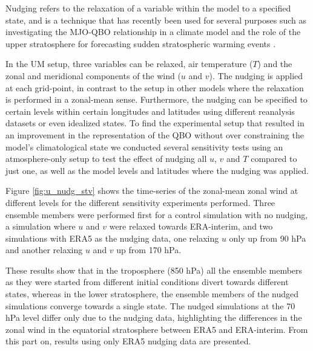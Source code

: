 Nudging refers to the relaxation of a variable within the model to a specified state, and is a technique that has recently been used for several purposes such as investigating the MJO-QBO relationship in a climate model \citep{martin2021} and the role of the upper stratosphere for forecasting sudden stratospheric warming events \citep{gray2020}.

In the UM setup, three variables can be relaxed, air temperature ($T$) and the zonal and meridional components of the wind ($u$ and $v$). The nudging is applied at each grid-point, in contrast to the setup in other models \citep[e.g.][]{martin2021} where the relaxation is performed in a zonal-mean sense. Furthermore, the nudging can be specified to certain levels within certain longitudes and latitudes using different reanalysis datasets or even idealized states. To find the experimental setup that resulted in an improvement in the representation of the QBO without over constraining the model's climatological state we conducted several sensitivity tests using an atmosphere-only setup to test the effect of nudging all $u$, $v$ and $T$ compared to just one, as well as the model levels and latitudes where the nudging was applied. 


Figure \ref{fig:u_nudg_stv} shows the time-series of the zonal-mean zonal wind at different levels for the different sensitivity experiments performed. Three ensemble members were performed first for a control simulation with no nudging, a simulation where $u$ and $v$ were relaxed towards ERA-interim, and two simulations with ERA5 as the nudging data, one relaxing $u$ only up from 90 hPa and another relaxing $u$ and $v$ up from 170 hPa. 


These results show that in the troposphere (850 hPa) all the ensemble members as they were started from different initial conditions divert towards different states, whereas in the lower stratosphere, the ensemble members of the nudged simulations converge towards a single state. The nudged simulations at the 70 hPa level differ only due to the nudging data, highlighting the differences in the zonal wind in the equatorial stratosphere between ERA5 and ERA-interim. 
From this part on, results using only ERA5 nudging data are presented. 

